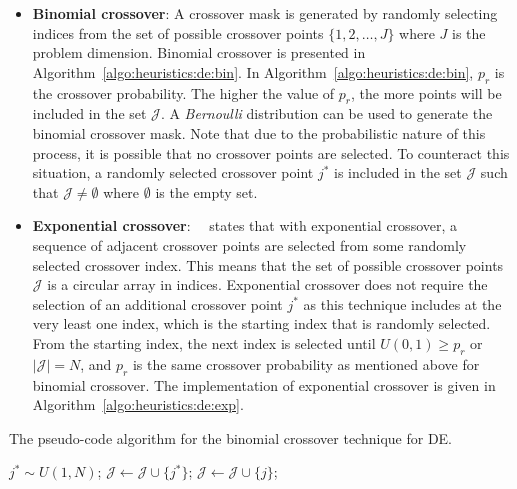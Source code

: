 \begin{itemize}
	\item \textbf{Binomial crossover}: A crossover mask is generated by randomly selecting indices from the set of possible crossover points $\{1,2,\dots,J\}$ where $J$ is the problem dimension. Binomial crossover is presented in Algorithm~\ref{algo:heuristics:de:bin}. In Algorithm~\ref{algo:heuristics:de:bin}, $p_{r}$ is the crossover probability. The higher the value of $p_{r}$, the more points will be included in the set $\mathcal{J}$. A \textit{Bernoulli} distribution can be used to generate the binomial crossover mask. Note that due to the probabilistic nature of this process, it is possible that no crossover points are selected. To counteract this situation, a randomly selected crossover point $j^{*}$ is included in the set $\mathcal{J}$ such that $\mathcal{J} \neq \emptyset$ where $\emptyset$ is the empty set.

	\item \textbf{Exponential crossover}:~\citeauthor{ref:engelbrecht:2007}~\cite{ref:engelbrecht:2007} states that with exponential crossover, a sequence of adjacent crossover points are selected from some randomly selected crossover index. This means that the set of possible crossover points $\mathcal{J}$ is a circular array in indices. Exponential crossover does not require the selection of an additional crossover point $j^{*}$ as this technique includes at the very least one index, which is the starting index that is randomly selected. From the starting index, the next index is selected until $U(0,1) \geq p_{r}$ or $|\mathcal{J}| = N$, and $p_{r}$ is the same crossover probability as mentioned above for binomial crossover. The implementation of exponential crossover is given in Algorithm~\ref{algo:heuristics:de:exp}.
\end{itemize}

\begin{algorithm}[htb]
	\caption{The pseudo-code algorithm for the binomial crossover technique for \acs{DE}.}
	\label{algo:heuristics:de:bin}
	\begin{algorithmic}
		\State $j^{*} \sim U(1,N)$;
		\State $\mathcal{J} \gets \mathcal{J} \cup \{j^{*}\}$;
		\State $\mathcal{J} \gets \mathcal{J} \cup \{j\}$;
		\EndIf
		\EndFor
	\end{algorithmic}
\end{algorithm}


